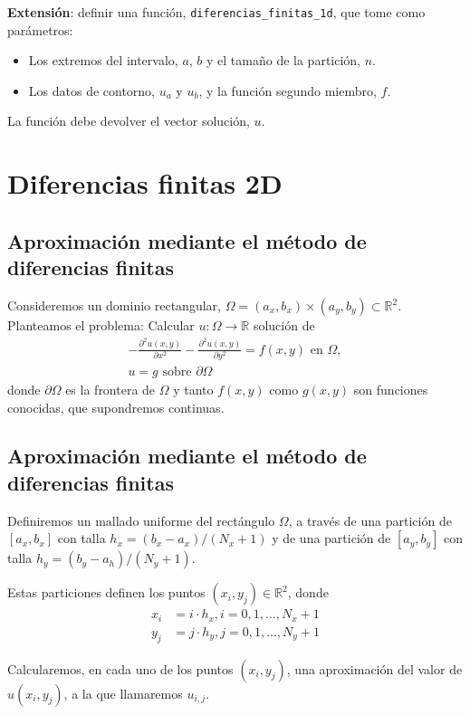 \documentclass[11pt,spanish]{article}
\def\Rset{\mathbb{R}}
\newcommand{\en}{\mbox{\ en \ }}
\newcommand{\sobre}{\mbox{\ sobre \ }}
\begin{document}
\textbf{Extensión}: definir una función, \verb|diferencias_finitas_1d|,
que tome como parámetros:
\begin{itemize}
\item Los extremos del intervalo, $a$, $b$ y el tamaño de la
  partición, $n$.
\item Los datos de contorno, $u_a$ y $u_b$, y la función segundo
  miembro, $f$.
\end{itemize}
La función debe devolver el vector solución, $u$.

\section{Diferencias finitas 2D}

\subsection{Aproximación mediante el método de diferencias finitas}
\label{sec:diferencias-finitas-dim-2}

Consideremos un dominio rectangular, $\Omega=(a_x,b_x)\times(a_y,b_y)
\subset \Rset^2$.
Planteamos el problema: Calcular $u:\Omega \to  \Rset$ solución de
\begin{align}
  \label{pb1d}
  -\frac{\partial^2 u(x,y) }{\partial x^2}
  -\frac{\partial^2 u(x,y) }{\partial y^2}
  = f(x,y) \en \Omega, \\
  u=g \sobre \partial\Omega
\end{align}
donde $\partial\Omega$ es la frontera de $\Omega$ y tanto $f(x,y)$
como $g(x,y)$ son funciones conocidas, que supondremos continuas.


\subsection{Aproximación mediante el método de diferencias finitas}
\label{sec:diferencias-finitas-dim-2}

Definiremos un mallado uniforme del rectángulo $\Omega$, a través de
una partición de $[a_x,b_x]$ con talla $h_x = (b_x-a_x)/(N_x+1)$ y de
una partición de $[a_y,b_y]$ con talla $h_y = (b_y-a_h)/(N_y+1)$.

Estas particiones definen los puntos $(x_i,y_j)\in\Rset^2$, donde
\begin{align*}
  x_i &= i\cdot h_x, i=0,1,...,N_x+1
  \\
  y_j &= j\cdot h_y, j=0,1,...,N_y+1
\end{align*}

Calcularemos, en cada uno de los puntos $(x_i,y_j)$, una aproximación del
valor de $u(x_i,y_j)$, a la que llamaremos $u_{i,j}$.
\end{document}
